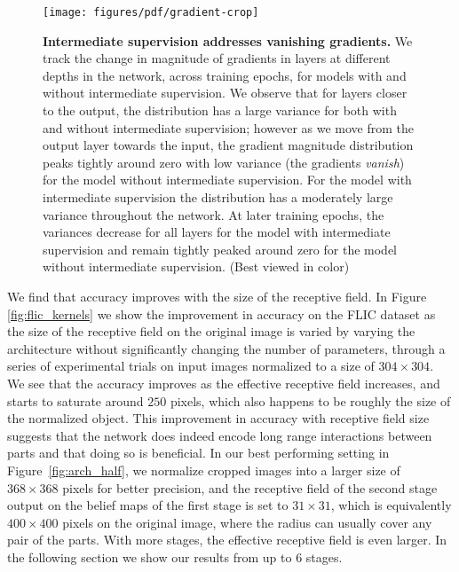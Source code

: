 \documentclass[10pt,twocolumn,letterpaper]{article}
\begin{document}
\begin{figure*}[ht!]
    \centering
    \texttt{[image: figures/pdf/gradient-crop]}
    \caption{\textbf{Intermediate supervision addresses vanishing gradients.} We track the change in magnitude of gradients in layers at different depths in the network, across training epochs, for models with and without intermediate supervision. We observe that for layers closer to the output, the distribution has a large variance for both with and without intermediate supervision; however as we move from the output layer towards the input, the gradient magnitude distribution peaks tightly around zero with low variance (the gradients \emph{vanish}) for the model without intermediate supervision. For the model with intermediate supervision the distribution has a moderately large variance throughout the network. At later training epochs, the variances decrease for all layers for the model with intermediate supervision and remain tightly peaked around zero for the model without intermediate supervision. (Best viewed in color)}
    \label{fig:gradient_change}
\end{figure*}
We find that accuracy improves with the size of the receptive field. In Figure \ref{fig:flic_kernels} we show the improvement in accuracy on the FLIC dataset \cite{sappmodec} as the size of the receptive field on the original image is varied by varying the architecture without significantly changing the number of parameters,  through a series of experimental trials on input images normalized to a size of $304 \times 304$. We see that the accuracy improves as the effective receptive field increases, and starts to saturate around $250$ pixels, which also happens to be roughly the size of the normalized object. This improvement in accuracy with receptive field size suggests that the network does indeed encode long range interactions between parts and that doing so is beneficial.
%
In our best performing setting in Figure~\ref{fig:arch_half}, we normalize cropped images into a larger size of $368 \times 368$ pixels for better precision, and the receptive field of the second stage output on the belief maps of the first stage is set to $31\times 31$, which is equivalently $400\times 400$ pixels on the original image, where the radius can usually cover any pair of the parts. With more stages, the effective receptive field is even larger. In the following section we show our results from up to $6$ stages.
\end{document}
